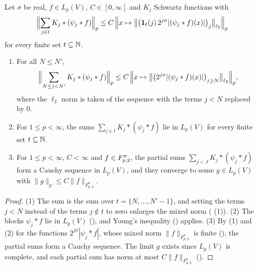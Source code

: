 \begin{lemma}
\label{lem:synthesis-sums-convergent}
\leanok
{}
Let $\sigma$ be real, $f \in L_p(V)$, $C \in [0, \infty]$ and $K_j$ Schwartz functions with
\[
  \Bigl\| \sum_{j \in t} K_j * (\psi_j * f) \Bigr\|_p \leq C \, \Bigl\| x \mapsto
  \bigl\| \bigl(\mathbf 1_t(j) \, 2^{j\sigma} |(\psi_j * f)(x)|\bigr)_j \bigr\|_{\ell_2}
  \Bigr\|_p
\]
for every finite set $t \subseteq \mathbb{N}$.
\begin{enumerate}
  \item For all $N \leq N'$,
    \[
      \Bigl\| \sum_{N \leq j < N'} K_j * (\psi_j * f) \Bigr\|_p \leq C \, \Bigl\| x \mapsto
      \bigl\| \bigl(2^{j\sigma} |(\psi_j * f)(x)|\bigr)_{j \geq N} \bigr\|_{\ell_2} \Bigr\|_p ,
    \]
    where the $\ell_2$ norm is taken of the sequence with the terms $j < N$ replaced by $0$.
  \item For $1 \leq p < \infty$, the sums $\sum_{j \in t} K_j * (\psi_j * f)$ lie in $L_p(V)$ for
    every finite set $t \subseteq \mathbb{N}$.
  \item For $1 \leq p < \infty$, $C < \infty$ and $f \in F^{\sigma}_{p,2}$, the partial sums
    $\sum_{j < J} K_j * (\psi_j * f)$ form a Cauchy sequence in $L_p(V)$, and they converge to
    some $g \in L_p(V)$ with $\|g\|_p \leq C \|f\|_{F^\sigma_{p,2}}$.
\end{enumerate}
\end{lemma}

\begin{proof}
\leanok
(1) The sum is the sum over $t = \{N, \dots, N' - 1\}$, and setting the terms $j < N$ instead of
the terms $j \notin t$ to zero enlarges the mixed norm ( (1)).
(2) The blocks $\psi_j * f$ lie in $L_p(V)$ (), and Young's
inequality () applies. (3) By (1) and  (2) for the
functions $2^{j\sigma} |\psi_j * f|$, whose mixed norm $\|f\|_{F^\sigma_{p,2}}$ is finite
(), the partial sums form a Cauchy sequence. The limit $g$ exists
since $L_p(V)$ is complete, and each partial sum has norm at most $C \|f\|_{F^\sigma_{p,2}}$
().
\end{proof}

